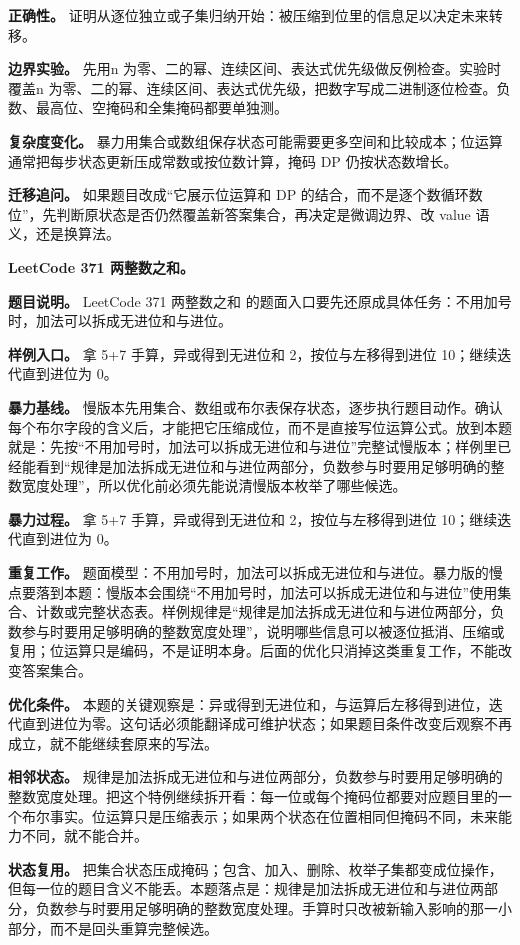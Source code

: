 \textbf{正确性。} 证明从逐位独立或子集归纳开始：被压缩到位里的信息足以决定未来转移。

\textbf{边界实验。} 先用n 为零、二的幂、连续区间、表达式优先级做反例检查。实验时覆盖n 为零、二的幂、连续区间、表达式优先级，把数字写成二进制逐位检查。负数、最高位、空掩码和全集掩码都要单独测。

\textbf{复杂度变化。} 暴力用集合或数组保存状态可能需要更多空间和比较成本；位运算通常把每步状态更新压成常数或按位数计算，掩码 DP 仍按状态数增长。

\textbf{迁移追问。} 如果题目改成“它展示位运算和 DP 的结合，而不是逐个数循环数位”，先判断原状态是否仍然覆盖新答案集合，再决定是微调边界、改 value 语义，还是换算法。

\noindent\textbf{LeetCode 371 两整数之和。}

\textbf{题目说明。} LeetCode 371 两整数之和 的题面入口要先还原成具体任务：不用加号时，加法可以拆成无进位和与进位。

\textbf{样例入口。} 拿 5+7 手算，异或得到无进位和 2，按位与左移得到进位 10；继续迭代直到进位为 0。

\textbf{暴力基线。} 慢版本先用集合、数组或布尔表保存状态，逐步执行题目动作。确认每个布尔字段的含义后，才能把它压缩成位，而不是直接写位运算公式。放到本题就是：先按“不用加号时，加法可以拆成无进位和与进位”完整试慢版本；样例里已经能看到“规律是加法拆成无进位和与进位两部分，负数参与时要用足够明确的整数宽度处理”，所以优化前必须先能说清慢版本枚举了哪些候选。

\textbf{暴力过程。} 拿 5+7 手算，异或得到无进位和 2，按位与左移得到进位 10；继续迭代直到进位为 0。

\textbf{重复工作。} 题面模型：不用加号时，加法可以拆成无进位和与进位。暴力版的慢点要落到本题：慢版本会围绕“不用加号时，加法可以拆成无进位和与进位”使用集合、计数或完整状态表。样例规律是“规律是加法拆成无进位和与进位两部分，负数参与时要用足够明确的整数宽度处理”，说明哪些信息可以被逐位抵消、压缩或复用；位运算只是编码，不是证明本身。后面的优化只消掉这类重复工作，不能改变答案集合。

\textbf{优化条件。} 本题的关键观察是：异或得到无进位和，与运算后左移得到进位，迭代直到进位为零。这句话必须能翻译成可维护状态；如果题目条件改变后观察不再成立，就不能继续套原来的写法。

\textbf{相邻状态。} 规律是加法拆成无进位和与进位两部分，负数参与时要用足够明确的整数宽度处理。把这个特例继续拆开看：每一位或每个掩码位都要对应题目里的一个布尔事实。位运算只是压缩表示；如果两个状态在位置相同但掩码不同，未来能力不同，就不能合并。

\textbf{状态复用。} 把集合状态压成掩码；包含、加入、删除、枚举子集都变成位操作，但每一位的题目含义不能丢。本题落点是：规律是加法拆成无进位和与进位两部分，负数参与时要用足够明确的整数宽度处理。手算时只改被新输入影响的那一小部分，而不是回头重算完整候选。

